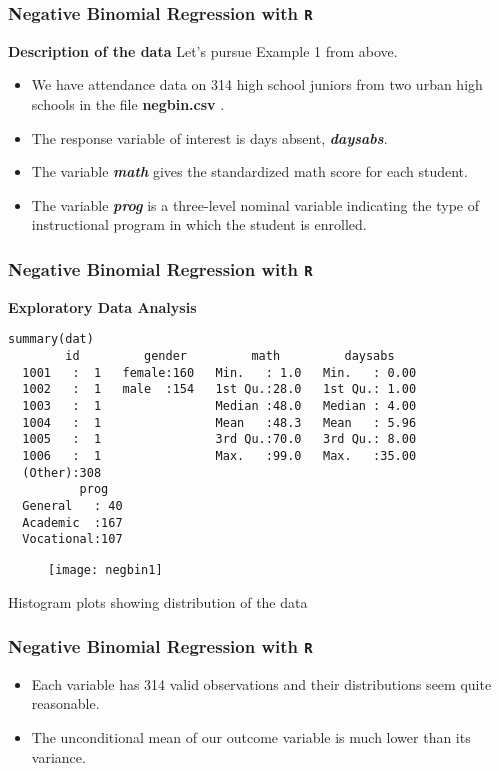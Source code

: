 \documentclass[MASTER.tex]{subfiles}
\begin{document}
\begin{frame}[fragile]
\frametitle{Negative Binomial Regression with \texttt{R} }
\Large
\textbf{Description of the data}
Let's pursue Example 1 from above.
\begin{itemize}
\item We have attendance data on 314 high school juniors from two urban high schools in the file \textbf{negbin.csv }. 
\item The response variable of interest is days absent, \textbf{\textit{daysabs}}. 
\item The variable \textbf{\textit{math}} gives the standardized math score for each student. 
\item The variable \textbf{\textit{prog}} is a three-level nominal variable indicating the type of instructional program in which the student is enrolled.
\end{itemize}
\end{frame}
\begin{frame}[fragile]
\frametitle{Negative Binomial Regression with \texttt{R} }
\normalsize
\textbf{Exploratory Data Analysis}

\begin{verbatim}	
summary(dat)
        id         gender         math         daysabs     
  1001   :  1   female:160   Min.   : 1.0   Min.   : 0.00  
  1002   :  1   male  :154   1st Qu.:28.0   1st Qu.: 1.00  
  1003   :  1                Median :48.0   Median : 4.00  
  1004   :  1                Mean   :48.3   Mean   : 5.96  
  1005   :  1                3rd Qu.:70.0   3rd Qu.: 8.00  
  1006   :  1                Max.   :99.0   Max.   :35.00  
  (Other):308                                              
          prog    
  General   : 40  
  Academic  :167  
  Vocational:107  
\end{verbatim}	
            
\end{frame}
\begin{frame}
\begin{figure}
\centering
\texttt{[image: negbin1]}
\end{figure}
Histogram plots showing distribution of the data
\end{frame}
\begin{frame}[fragile]
	\frametitle{Negative Binomial Regression with \texttt{R} }
	\Large


\begin{itemize}
\item Each variable has 314 valid observations and their distributions seem quite reasonable. 
\item The unconditional mean of our outcome variable is much lower than its variance.
\end{itemize}

\end{frame}
\end{document}
